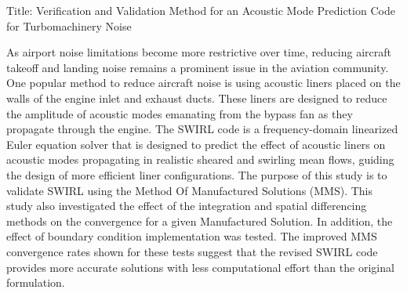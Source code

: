 \documentclass[a4paper]{article}
\begin{document}
Title: Verification and Validation Method for an Acoustic Mode Prediction Code
for Turbomachinery Noise

As airport noise limitations become more restrictive over time, reducing aircraft 
takeoff and landing noise remains a prominent issue in the aviation community. 
One popular method to reduce aircraft noise is using acoustic liners placed on 
the walls of the engine inlet and exhaust ducts. These liners are designed to 
reduce the amplitude of acoustic modes emanating from the bypass fan as they 
propagate through the engine. The SWIRL code is a frequency-domain linearized 
Euler equation solver that is designed to predict the effect of acoustic liners
on acoustic modes propagating in realistic sheared and swirling mean flows, guiding
the design of more efficient liner configurations. The purpose of this study is
to validate SWIRL using the Method Of Manufactured Solutions (MMS). This study 
also investigated the effect of the integration and spatial differencing methods 
on the convergence for a given Manufactured Solution. In addition, the effect 
of boundary condition implementation was tested.  The improved MMS convergence
rates shown for these tests suggest that the revised SWIRL code provides more 
accurate solutions with less computational effort than the original formulation.
\end{document}
